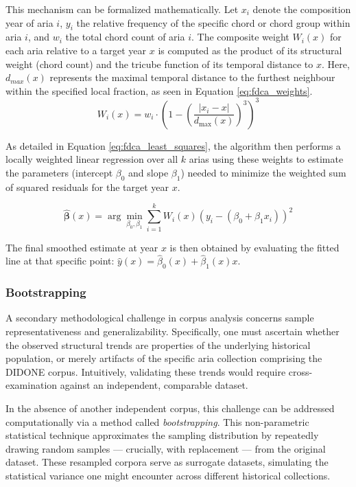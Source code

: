 \documentclass[10pt,a4paper,twocolumn]{article}
\begin{document}
This mechanism can be formalized mathematically. Let $x_i$ denote the composition year of aria $i$, $y_i$ the relative frequency of the specific chord or chord group within aria $i$, and $w_i$ the total chord count of aria $i$. The composite weight $W_i(x)$ for each aria relative to a target year $x$ is computed as the product of its structural weight (chord count) and the tricube function of its temporal distance to $x$. Here, $d_{max}(x)$ represents the maximal temporal distance to the furthest neighbour within the specified local fraction, as seen in Equation \ref{eq:fdca_weights}.
\begin{equation}
    W_i(x) = w_i \cdot \left(1 - \left(\frac{|x_i - x|}{d_{\text{max}}(x)}\right)^3\right)^3 
    \label{eq:fdca_weights}
\end{equation}

As detailed in Equation \ref{eq:fdca_least_squares}, the algorithm then performs a locally weighted linear regression over all $k$ arias using these weights to estimate the parameters (intercept $\beta_0$ and slope $\beta_1$) needed to minimize the weighted sum of squared residuals for the target year $x$.

\begin{equation}
    \hat{\boldsymbol{\beta}}(x) = \arg\min_{\beta_0,\beta_1} \sum_{i=1}^{k} W_i(x) \left( y_i - (\beta_0 + \beta_1x_i) \right)^2
    \label{eq:fdca_least_squares}
\end{equation}

The final smoothed estimate at year $x$ is then obtained by evaluating the fitted line at that specific point: $\hat{y}(x) = \hat{\beta}_0(x) + \hat{\beta}_1(x)x$.

\subsubsection{Bootstrapping}
A secondary methodological challenge in corpus analysis concerns sample representativeness and generalizability. Specifically, one must ascertain whether the observed structural trends are properties of the underlying historical population, or merely artifacts of the specific aria collection comprising the DIDONE corpus. Intuitively, validating these trends would require cross-examination against an independent, comparable dataset.

In the absence of another independent corpus, this challenge can be addressed computationally via a method called \textit{bootstrapping}. This non-parametric statistical technique approximates the sampling distribution by repeatedly drawing random samples --- crucially, with replacement --- from the original dataset. These resampled corpora serve as surrogate datasets, simulating the statistical variance one might encounter across different historical collections.
\end{document}
